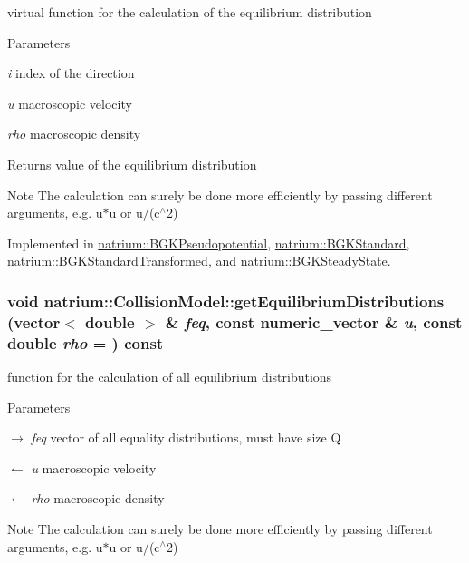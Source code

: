 virtual function for the calculation of the equilibrium distribution 
\begin{DoxyParams}{Parameters}
\item[{\em i}]index of the direction \item[{\em u}]macroscopic velocity \item[{\em rho}]macroscopic density \end{DoxyParams}
\begin{DoxyReturn}{Returns}
value of the equilibrium distribution 
\end{DoxyReturn}
\begin{DoxyNote}{Note}
The calculation can surely be done more efficiently by passing different arguments, e.g. u$\ast$u or u/(c$^\wedge$2) 
\end{DoxyNote}


Implemented in \hyperlink{classnatrium_1_1BGKPseudopotential_a63ce98e44a07466963fb123cac9dd905}{natrium::BGKPseudopotential}, \hyperlink{classnatrium_1_1BGKStandard_a3d45ef2fe5536bf14914f99297477754}{natrium::BGKStandard}, \hyperlink{classnatrium_1_1BGKStandardTransformed_a870465cc026f92c8ffba899af6f95634}{natrium::BGKStandardTransformed}, and \hyperlink{classnatrium_1_1BGKSteadyState_ad99d9159cc14b5897bea7f145c3b39ca}{natrium::BGKSteadyState}.\hypertarget{classnatrium_1_1CollisionModel_a296474961c4501bc23228be1d30ebf82}{
\subsubsection[{getEquilibriumDistributions}]{\setlength{\rightskip}{0pt plus 5cm}void natrium::CollisionModel::getEquilibriumDistributions (vector$<$ double $>$ \& {\em feq}, \/  const numeric\_\-vector \& {\em u}, \/  const double {\em rho} = {}) const}}
\label{classnatrium_1_1CollisionModel_a296474961c4501bc23228be1d30ebf82}


function for the calculation of all equilibrium distributions 
\begin{DoxyParams}{Parameters}
\item[\mbox{$\rightarrow$} {\em feq}]vector of all equality distributions, must have size Q \item[\mbox{$\leftarrow$} {\em u}]macroscopic velocity \item[\mbox{$\leftarrow$} {\em rho}]macroscopic density \end{DoxyParams}
\begin{DoxyNote}{Note}
The calculation can surely be done more efficiently by passing different arguments, e.g. u$\ast$u or u/(c$^\wedge$2) 
\end{DoxyNote}


